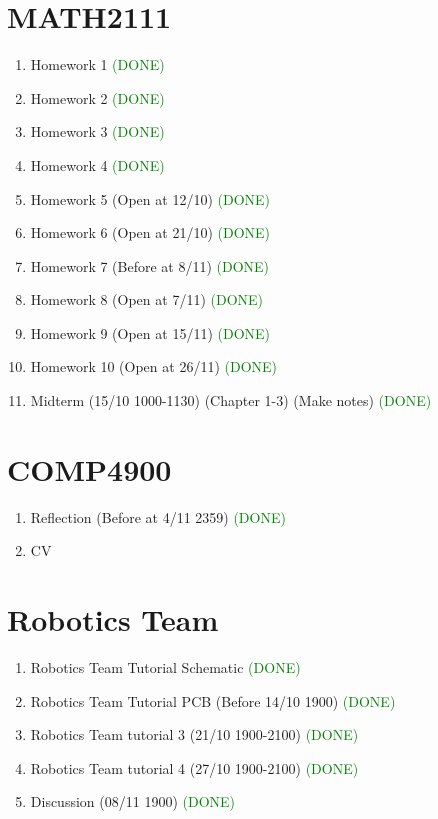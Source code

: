 \documentclass[11pt]{article}
\begin{document}
\section{MATH2111}
\begin{enumerate}
    \item Homework 1 \textcolor{green}{(DONE)}
    \item Homework 2 \textcolor{green}{(DONE)}
    \item Homework 3 \textcolor{green}{(DONE)}
    \item Homework 4 \textcolor{green}{(DONE)}
    \item Homework 5 (Open at 12/10) \textcolor{green}{(DONE)}
    \item Homework 6 (Open at 21/10) \textcolor{green}{(DONE)}
    \item Homework 7 (Before at 8/11) \textcolor{green}{(DONE)}
    \item Homework 8 (Open at 7/11) \textcolor{green}{(DONE)}
    \item Homework 9 (Open at 15/11) \textcolor{green}{(DONE)}
    \item Homework 10 (Open at 26/11) \textcolor{green}{(DONE)}
    \item Midterm (15/10 1000-1130) (Chapter 1-3) (Make notes) \textcolor{green}{(DONE)}
\end{enumerate}



\section{COMP4900}
\begin{enumerate}
    \item Reflection (Before at 4/11 2359) \textcolor{green}{(DONE)}
    \item CV
\end{enumerate}



\section{Robotics Team}
\begin{enumerate}
    \item Robotics Team Tutorial Schematic \textcolor{green}{(DONE)}
    \item Robotics Team Tutorial PCB (Before 14/10 1900) \textcolor{green}{(DONE)}
    \item Robotics Team tutorial 3 (21/10 1900-2100) \textcolor{green}{(DONE)}
    \item Robotics Team tutorial 4 (27/10 1900-2100) \textcolor{green}{(DONE)}
    \item Discussion (08/11 1900) \textcolor{green}{(DONE)}
\end{enumerate}
\end{document}
